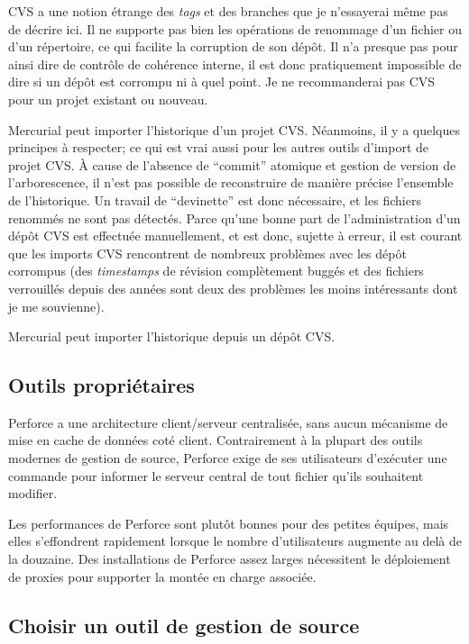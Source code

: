 CVS a une notion étrange des \textit{tags} et des branches que je n'essayerai
même pas de décrire ici. Il ne supporte pas bien les opérations de renommage d'un 
fichier ou d'un répertoire, ce qui facilite la corruption de son dépôt. Il n'a
presque pas pour ainsi dire de contrôle de cohérence interne, il est donc 
pratiquement impossible de dire si un dépôt est corrompu ni à quel point. Je
ne recommanderai pas CVS pour un projet existant ou nouveau.

Mercurial peut importer l'historique d'un projet CVS. Néanmoins, il y a 
quelques principes à respecter; ce qui est vrai aussi pour les autres
outils d'import de projet CVS. À cause de l'absence de ``commit'' atomique
et gestion de version de l'arborescence, il n'est pas possible de reconstruire
de manière précise l'ensemble de l'historique. Un travail de ``devinette''
est donc nécessaire, et les fichiers renommés ne sont pas détectés. Parce 
qu'une bonne part de l'administration d'un dépôt CVS est effectuée manuellement, 
et est donc, sujette à erreur, il est courant que les imports CVS rencontrent 
de nombreux problèmes avec les dépôt corrompus (des \textit{timestamps} 
de révision complètement buggés et des fichiers verrouillés depuis des années 
sont deux des problèmes les moins intéressants dont je me souvienne).

Mercurial peut importer l'historique depuis un dépôt CVS.

\subsection{Outils propriétaires} 

Perforce a une architecture client/serveur centralisée, sans aucun
mécanisme de mise en cache de données coté client. Contrairement à la plupart
des outils modernes de gestion de source, Perforce exige de ses 
utilisateurs d'exécuter une commande pour informer le serveur
central de tout fichier qu'ils souhaitent modifier.

Les performances de Perforce sont plutôt bonnes pour des petites
équipes, mais elles s'effondrent rapidement lorsque le nombre 
d'utilisateurs augmente au delà de la douzaine. Des installations 
de Perforce assez larges nécessitent le déploiement de proxies pour 
supporter la montée en charge associée.

\subsection{Choisir un outil de gestion de source}

